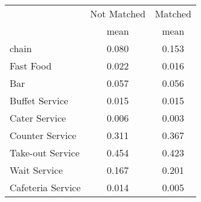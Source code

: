 {
\def\sym#1{\ifmmode^{#1}\else\(^{#1}\)\fi}
\begin{tabular}{l*{2}{c}}
\hline\hline
                    &\multicolumn{1}{c}{Not Matched}&\multicolumn{1}{c}{Matched}\\
                    &        mean&        mean\\
\hline
chain               &       0.080&       0.153\\
Fast Food           &       0.022&       0.016\\
Bar                 &       0.057&       0.056\\
Buffet Service      &       0.015&       0.015\\
Cater Service       &       0.006&       0.003\\
Counter Service     &       0.311&       0.367\\
Take-out Service    &       0.454&       0.423\\
Wait Service        &       0.167&       0.201\\
Cafeteria Service   &       0.014&       0.005\\
\hline\hline
\end{tabular}
}
